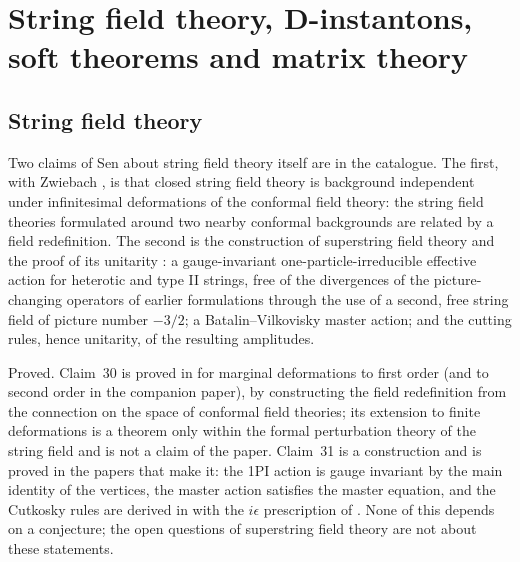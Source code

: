 \section{String field theory, D-instantons, soft theorems and matrix theory}\label{sec:sft}

\subsection{String field theory}\label{ssec:sft}

Two claims of Sen about string field theory itself are in the catalogue. The first, with Zwiebach \cite{SenZwiebach94}, is that closed string field theory is background independent under infinitesimal deformations of the conformal field theory: the string field theories formulated around two nearby conformal backgrounds are related by a field redefinition. The second is the construction of superstring field theory \cite{Sen15offshell,Sen15onePI,Sen16BV} and the proof of its unitarity \cite{Sen16unitarity}: a gauge-invariant one-particle-irreducible effective action for heterotic and type II strings, free of the divergences of the picture-changing operators of earlier formulations through the use of a second, free string field of picture number $-3/2$; a Batalin--Vilkovisky master action; and the cutting rules, hence unitarity, of the resulting amplitudes.

\begin{verdict}[claims 30, 31]
Proved. Claim~30 is proved in \cite{SenZwiebach94} for marginal deformations to first order (and to second order in the companion paper), by constructing the field redefinition from the connection on the space of conformal field theories; its extension to finite deformations is a theorem only within the formal perturbation theory of the string field and is not a claim of the paper. Claim~31 is a construction and is proved in the papers that make it: the 1PI action is gauge invariant by the main identity of the vertices, the master action satisfies the master equation, and the Cutkosky rules are derived in \cite{Sen16unitarity} with the $i\epsilon$ prescription of \cite{Pius16}. None of this depends on a conjecture; the open questions of superstring field theory are not about these statements.
\end{verdict}

